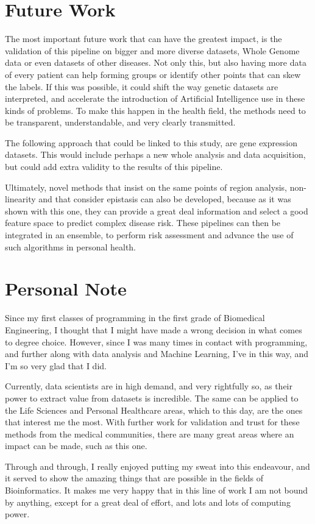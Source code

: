 \section{Future Work}

The most important future work that can have the greatest impact, is the validation of this pipeline on bigger and more diverse datasets, Whole Genome data or even datasets of other diseases. Not only this, but also having more data of every patient can help forming groups or identify other points that can skew the labels. If this was possible, it could shift the way genetic datasets are interpreted, and accelerate the introduction of Artificial Intelligence use in these kinds of problems. To make this happen in the health field, the methods need to be transparent, understandable, and very clearly transmitted.

The following approach that could be linked to this study, are gene expression datasets. This would include perhaps a new whole analysis and data acquisition, but could add extra validity to the results of this pipeline.   

Ultimately, novel methods that insist on the same points of region analysis, non-linearity and that consider epistasis can also be developed, because as it was shown with this one, they can provide a great deal information and select a good feature space to predict complex disease risk. These pipelines can then be integrated in an ensemble, to perform risk assessment and advance the use of such algorithms in personal health.  

\section{Personal Note}

Since my first classes of programming in the first grade of Biomedical Engineering, I thought that I might have made a wrong decision in what comes to degree choice. However, since I was many times in contact with programming, and further along with data analysis and Machine Learning, I've in this way, and I'm so very glad that I did. 

Currently, data scientists are in high demand, and very rightfully so, as their power to extract value from datasets is incredible. The same can be applied to the Life Sciences and Personal Healthcare areas, which to this day, are the ones that interest me the most. With further work for validation and trust for these methods from the medical communities, there are many great areas where an impact can be made, such as this one.

Through and through, I really enjoyed putting my sweat into this endeavour, and it served to show the amazing things that are possible in the fields of Bioinformatics. It makes me very happy that in this line of work I am not bound by anything, except for a great deal of effort, and lots and lots of computing power. 
